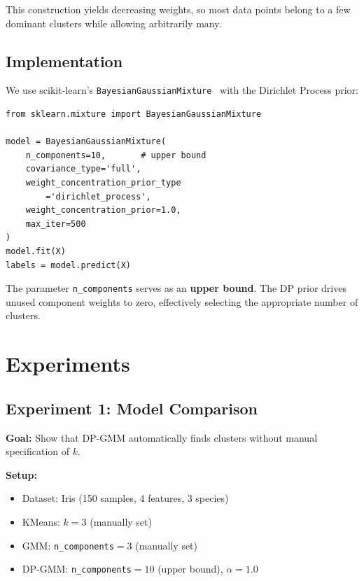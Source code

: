 \documentclass[conference]{IEEEtran}
\begin{document}
This construction yields decreasing weights, so most data points belong to a few dominant clusters while allowing arbitrarily many.

\subsection{Implementation}

We use scikit-learn's \texttt{BayesianGaussianMixture}~\cite{pedregosa2011} with the Dirichlet Process prior:

\begin{lstlisting}[caption={DP-GMM Implementation}]
from sklearn.mixture import BayesianGaussianMixture

model = BayesianGaussianMixture(
    n_components=10,       # upper bound
    covariance_type='full',
    weight_concentration_prior_type
        ='dirichlet_process',
    weight_concentration_prior=1.0,
    max_iter=500
)
model.fit(X)
labels = model.predict(X)
\end{lstlisting}

The parameter \texttt{n\_components} serves as an \textbf{upper bound}. The DP prior drives unused component weights to zero, effectively selecting the appropriate number of clusters.

\section{Experiments}

\subsection{Experiment 1: Model Comparison}

\textbf{Goal:} Show that DP-GMM automatically finds clusters without manual specification of $k$.

\textbf{Setup:}
\begin{itemize}
    \item Dataset: Iris (150 samples, 4 features, 3 species)
    \item KMeans: $k=3$ (manually set)
    \item GMM: \texttt{n\_components}$=3$ (manually set)
    \item DP-GMM: \texttt{n\_components}$=10$ (upper bound), $\alpha=1.0$
\end{itemize}
\end{document}
